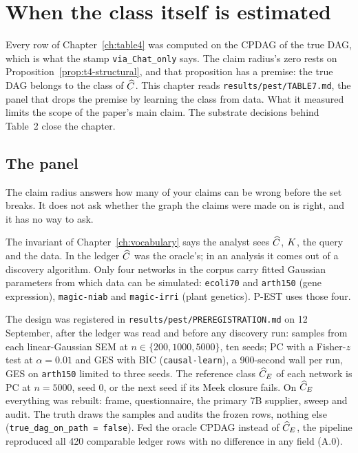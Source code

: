 \chapter{When the class itself is estimated}\label{ch:pest}

Every row of Chapter~\ref{ch:table4} was computed on the CPDAG of the true DAG, which is what the stamp
\texttt{via\_Chat\_only} says. The claim radius's zero rests on Proposition~\ref{prop:t4-structural},
and that proposition has a premise: the true DAG belongs to the
class of $\widehat{C}$. This chapter reads \texttt{results/pest/TABLE7.md}, the panel that drops the premise
by learning the class from data. What it measured limits the scope of the paper's main claim. The
substrate decisions behind Table~2 close the chapter.

\begin{antes}
\end{antes}

\section{The panel}

\begin{ideia}
The claim radius answers how many of your claims can be wrong before the set breaks. It does not ask
whether the graph the claims were made on is right, and it has no way to ask.
\end{ideia}

The invariant of Chapter~\ref{ch:vocabulary} says the analyst sees $\widehat{C}$, $K$, the query and the
data. In the ledger $\widehat{C}$ was the oracle's; in an analysis it comes out of a discovery algorithm.
Only four networks in the corpus carry fitted Gaussian parameters from which data can be simulated:
\texttt{ecoli70} and \texttt{arth150} (gene expression), \texttt{magic-niab} and \texttt{magic-irri}
(plant genetics). P-EST uses those four.

The design was registered in \texttt{results/pest/PREREGISTRATION.md} on 12 September, after the
ledger was read and before any discovery run: samples from each linear-Gaussian SEM at
$n \in \{200, 1000, 5000\}$, ten seeds; PC with a Fisher-$z$ test at $\alpha = 0.01$ and GES with BIC
(\texttt{causal-learn}), a 900-second wall per run, GES on \texttt{arth150} limited to three seeds. The
reference class $\widehat{C}_E$ of each network is PC at $n = 5000$, seed 0, or the next seed if its Meek
closure fails. On $\widehat{C}_E$ everything was rebuilt: frame, questionnaire, the primary 7B supplier,
sweep and audit. The truth draws the samples and audits the frozen rows, nothing else
(\texttt{true\_dag\_on\_path = false}). Fed the oracle CPDAG instead of $\widehat{C}_E$, the pipeline
reproduced all 420 comparable ledger rows with no difference in any field (A.0).

